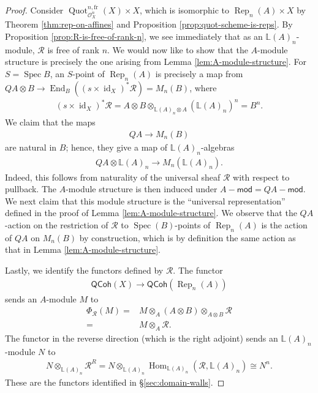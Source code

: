 \documentclass{article}
\numberwithin{equation}{section}
\theoremstyle{quest}
\theoremstyle{definition}
\theoremstyle{remark}
\newcommand{\msf}{\mathsf}
\newcommand{\Mod}{-\msf{mod}}
\DeclareMathOperator{\Hom}{Hom}
\DeclareMathOperator{\Spec}{Spec}
\DeclareMathOperator{\id}{id}
\DeclareMathOperator{\End}{End}
\DeclareMathOperator{\Rep}{Rep}
\DeclareMathOperator{\Quot}{Quot}
\begin{document}
\begin{proof}
	Consider $\Quot^{n,\text{fr}}_{\mathscr{O}_X^n}(X)\times X$, which is isomorphic to $\Rep_n(A)\times X$ by Theorem \ref{thm:rep-on-affines} and Proposition \ref{prop:quot-scheme-is-reps}. By Proposition \ref{prop:R-is-free-of-rank-n}, we see immediately that as an $\mathbb{L}(A)_n$-module, $\mathscr{R}$ is free of rank $n$. We would now like to show that the $A$-module structure is precisely the one arising from Lemma \ref{lem:A-module-structure}. For $S=\Spec B$, an $S$-point of $\Rep _n(A)$ is precisely a map from $QA\otimes B\to \End_B((s\times \id_X)^*\mathscr{R})= M_n(B)$, where
	\begin{align*}
		(s\times \id_X)^*\mathscr{R}=A\otimes B\otimes _{\mathbb{L}(A)_n\otimes A}(\mathbb{L}(A)_n)^n=B^n.
	\end{align*} 
	We claim that the maps
	\begin{align*}
		QA\to M_n(B)
	\end{align*} 
	are natural in $B$; hence, they give a map of $\mathbb{L}(A)_n$-algebras
	\begin{align*}
		QA\otimes \mathbb{L}(A)_n\to M_n(\mathbb{L}(A)_n).
	\end{align*} 
	Indeed, this follows from naturality of the universal sheaf $\mathscr{R}$ with respect to pullback. The $A$-module structure is then induced under $A\Mod=QA\Mod$. We next claim that this module structure is the ``universal representation'' defined in the proof of Lemma \ref{lem:A-module-structure}. We observe that the $QA$-action on the restriction of $\mathscr{R}$ to $\Spec(B)$-points of $\Rep_n(A)$ is the action of $QA$ on $M_n(B)$ by construction, which is by definition the same action as that in Lemma \ref{lem:A-module-structure}.

	Lastly, we identify the functors defined by $\mathscr{R}$. The functor
	\begin{align*}
		\mathsf{QCoh}(X)\to \mathsf{QCoh}(\Rep_n(A))
	\end{align*} 
	sends an $A$-module $M$ to
	\begin{align*}
		\Phi_{\mathscr{R}}(M)=&M\otimes _A (A\otimes B)\otimes _{A\otimes B} \mathscr{R}\\
		=&M\otimes _A \mathscr{R}.
	\end{align*} 
	The functor in the reverse direction (which is the right adjoint) sends an $\mathbb{L}(A)_n$-module $N$ to
	\begin{align*}
		N\otimes _{\mathbb{L}(A)_n}\mathscr{R}^R=N\otimes _{\mathbb{L}(A)_n}\Hom_{\mathbb{L}(A)_n}(\mathscr{R},\mathbb{L}(A)_n)\cong N^n.
	\end{align*} 
	These are the functors identified in \S\ref{sec:domain-walls}.
\end{proof} 
\end{document}
